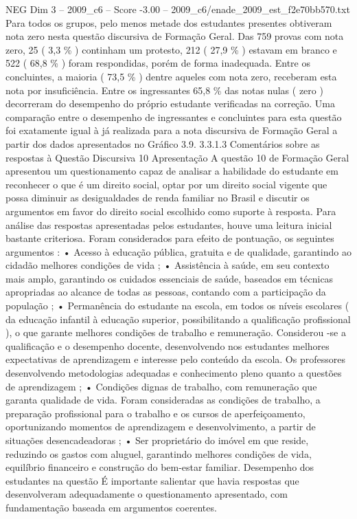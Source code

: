 \begin{textsample}{NEG Dim 3 – 2009\_c6 – Score -3.00 – 2009\_c6/enade\_2009\_est\_f2e70bb570.txt}
Para todos os grupos, pelo menos metade dos estudantes presentes obtiveram nota zero nesta questão discursiva de Formação Geral.
Das 759 provas com nota zero, 25 ( 3,3 \% ) continham um protesto, 212 ( 27,9 \% ) estavam em branco e 522 ( 68,8 \% ) foram respondidas, porém de forma inadequada.
Entre os concluintes, a maioria ( 73,5 \% ) dentre aqueles com nota zero, receberam esta nota por insuficiência.
Entre os ingressantes 65,8 \% das notas nulas ( zero ) decorreram do desempenho do próprio estudante verificadas na correção.
Uma comparação entre o desempenho de ingressantes e concluintes para esta questão foi exatamente igual à já realizada para a nota discursiva de Formação Geral a partir dos dados apresentados no Gráfico 3.9. 3.3.1.3 Comentários sobre as respostas à Questão Discursiva 10 Apresentação A questão 10 de Formação Geral apresentou um questionamento capaz de analisar a habilidade do estudante em reconhecer o que é um direito social, optar por um direito social vigente que possa diminuir as desigualdades de renda familiar no Brasil e discutir os argumentos em favor do direito social escolhido como suporte à resposta.
Para análise das respostas apresentadas pelos estudantes, houve uma leitura inicial bastante criteriosa.
Foram considerados para efeito de pontuação, os seguintes argumentos : • Acesso à educação pública, gratuita e de qualidade, garantindo ao cidadão melhores condições de vida ; • Assistência à saúde, em seu contexto mais amplo, garantindo os cuidados essenciais de saúde, baseados em técnicas apropriadas ao alcance de todas as pessoas, contando com a participação da população ; • Permanência do estudante na escola, em todos os níveis escolares ( da educação infantil à educação superior, possibilitando a qualificação profissional ), o que garante melhores condições de trabalho e remuneração.
Considerou -se a qualificação e o desempenho docente, desenvolvendo nos estudantes melhores expectativas de aprendizagem e interesse pelo conteúdo da escola.
Os professores desenvolvendo metodologias adequadas e conhecimento pleno quanto a questões de aprendizagem ; • Condições dignas de trabalho, com remuneração que garanta qualidade de vida.
Foram consideradas as condições de trabalho, a preparação profissional para o trabalho e os cursos de aperfeiçoamento, oportunizando momentos de aprendizagem e desenvolvimento, a partir de situações desencadeadoras ; • Ser proprietário do imóvel em que reside, reduzindo os gastos com aluguel, garantindo melhores condições de vida, equilíbrio financeiro e construção do bem-estar familiar.
Desempenho dos estudantes na questão É importante salientar que havia respostas que desenvolveram adequadamente o questionamento apresentado, com fundamentação baseada em argumentos coerentes.

\end{textsample}
